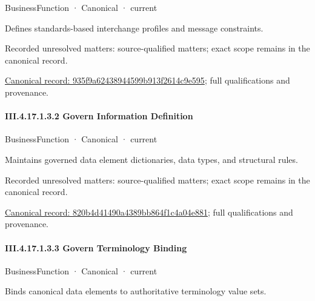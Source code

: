 \label{element:935f9a62438944599b913f2614c9e595}
{\small BusinessFunction · Canonical · current}\par

Defines standards-based interchange profiles and message constraints.


{\small Recorded unresolved matters: source-qualified matters; exact scope remains in the canonical record.}\par
{\footnotesize \href{../../../../../../../../continuum/business/business-function/935f9a62438944599b913f2614c9e595.md}{Canonical record: 935f9a62438944599b913f2614c9e595}; full qualifications and provenance.}\par
\paragraph*{III.4.17.1.3.2 Govern Information Definition}
\label{navigation:III.4.17.1.3.2}

\label{element:820b4d41490a4389bb864f1c4a04e881}
{\small BusinessFunction · Canonical · current}\par

Maintains governed data element dictionaries, data types, and structural rules.


{\small Recorded unresolved matters: source-qualified matters; exact scope remains in the canonical record.}\par
{\footnotesize \href{../../../../../../../../continuum/business/business-function/820b4d41490a4389bb864f1c4a04e881.md}{Canonical record: 820b4d41490a4389bb864f1c4a04e881}; full qualifications and provenance.}\par
\paragraph*{III.4.17.1.3.3 Govern Terminology Binding}
\label{navigation:III.4.17.1.3.3}

\label{element:9e96ce12b7494594a6129f79f7491223}
{\small BusinessFunction · Canonical · current}\par

Binds canonical data elements to authoritative terminology value sets.



